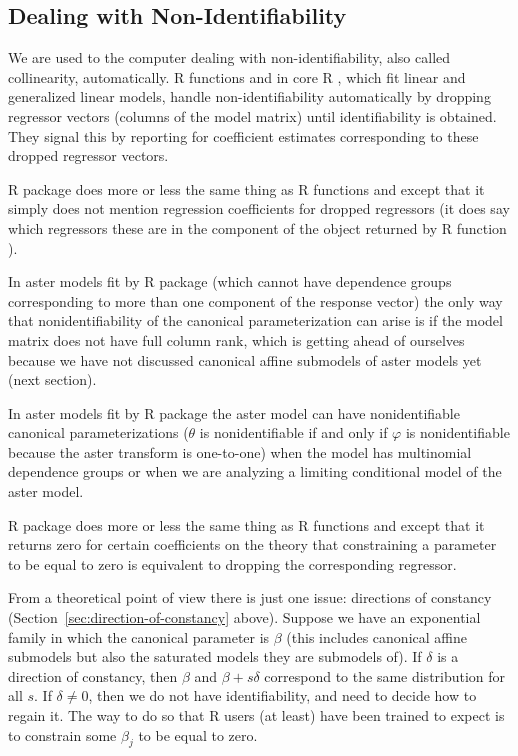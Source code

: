 \subsection{Dealing with Non-Identifiability}
\label{sec:dealing}

We are used to the computer dealing with non-identifiability, also called
collinearity, automatically.  R functions  and  in core R
\citep{r-core}, which fit linear and generalized linear models, handle
non-identifiability automatically
by dropping regressor vectors (columns of the model matrix) until
identifiability is obtained.  They signal this by reporting  for
coefficient estimates corresponding to these dropped regressor vectors.

R package  does more or less the same thing as R functions
 and  except that it simply does not mention regression
coefficients for dropped regressors (it does say which regressors these are
in the component  of the object returned by R function
).

In aster models fit by R package  (which cannot have dependence
groups corresponding to more than one component of the response vector)
the only way that nonidentifiability of the canonical parameterization
can arise is if the model matrix does not have full column rank,
which is getting ahead of ourselves because we have not discussed
canonical affine submodels of aster models yet (next section).

In aster models fit by R package  the aster model can
have nonidentifiable canonical parameterizations ($\theta$ is nonidentifiable
if and only if $\varphi$ is nonidentifiable because the aster transform
is one-to-one) when the model has multinomial dependence groups or when
we are analyzing a limiting conditional model of the aster model.

R package  does more or less the same thing as R functions
 and  except that it returns zero for certain
coefficients on the theory that constraining a parameter to be equal to zero
is equivalent to dropping the corresponding regressor. 

From a theoretical point of view there is just one issue: directions of
constancy (Section~\ref{sec:direction-of-constancy} above).
Suppose we have an exponential family in which the canonical parameter
is $\beta$ (this includes canonical affine submodels but also the
saturated models
they are submodels of).  If $\delta$ is a direction of constancy, then
$\beta$ and $\beta + s \delta$ correspond to the same distribution for
all $s$.  If $\delta \neq 0$, then we do not have identifiability, and
need to decide how to regain it.  The way to do so that R users (at least)
have been trained to expect is to constrain some $\beta_j$ to be equal
to zero.

